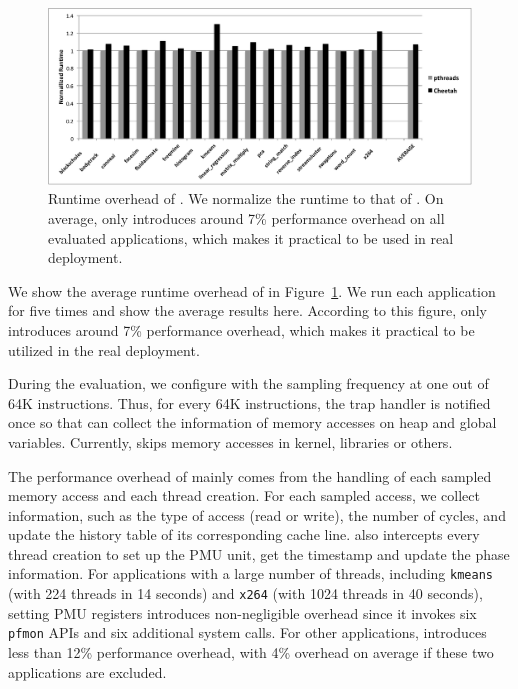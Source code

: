 \begin{figure}[htbp]
\centering
\includegraphics[width=2\columnwidth]{figure/Overhead.pdf}
\caption{Runtime overhead of \Cheetah{}. We normalize the runtime to that of \pthreads{}. On average, \cheetah{} only introduces around 7\% performance overhead on all evaluated applications, which makes it practical to be used in real deployment. \label{fig:overhead}}
\end{figure}

We show the average runtime overhead of \cheetah{} in Figure~\ref{fig:overhead}. We run each application for five times and show the average results here. According to this figure, \cheetah{} only introduces around 7\% performance overhead, which makes it practical to be utilized in the real deployment. 

During the evaluation, we configure \cheetah{} with the sampling frequency at one out of 64K instructions. Thus, for every 64K instructions, the trap handler is notified once so that \cheetah{} can collect the information of memory accesses on heap and global variables. Currently, \Cheetah{} skips memory accesses in kernel, libraries or others. 

The performance overhead of \cheetah{} mainly comes from the handling of each sampled memory access and each thread creation. For each sampled access, we collect information, such as the type of access (read or write), the number of cycles, and update  the history table of its corresponding cache line. \cheetah{} also intercepts every thread creation to set up the PMU unit, get the timestamp and update the phase information. For applications with a large number of threads, including \texttt{kmeans} (with 224 threads in 14 seconds) and \texttt{x264} (with 1024 threads in 40 seconds), setting PMU registers introduces non-negligible overhead since it invokes six \texttt{pfmon} APIs and six additional system calls. For other applications, \cheetah{} introduces less than 12\% performance overhead, with 4\% overhead on average if these two applications are excluded.  

